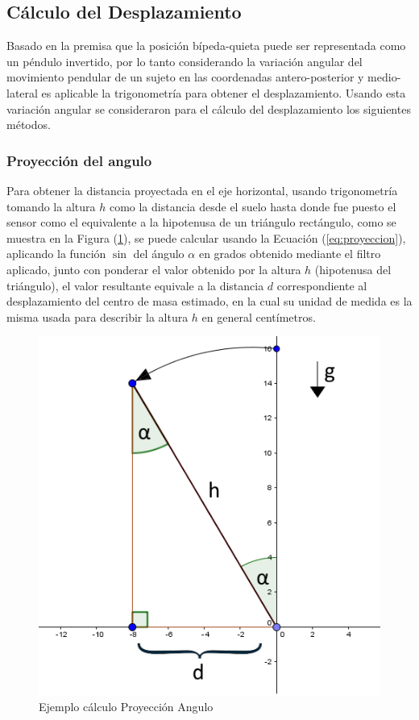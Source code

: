 \documentclass[12pt,a4paper]{article}
\begin{document}
\subsection{Cálculo del Desplazamiento}
Basado en la premisa que la posición bípeda-quieta puede ser representada como un péndulo invertido, por lo tanto considerando la variación angular del movimiento pendular de un sujeto en las coordenadas antero-posterior y medio-lateral es aplicable la trigonometría para obtener el desplazamiento.
Usando esta variación angular se consideraron para el cálculo del desplazamiento los siguientes métodos. 

\subsubsection{Proyección del angulo}
Para obtener la distancia proyectada en el eje horizontal, usando trigonometría tomando la altura $h$ como la distancia desde el suelo hasta donde fue puesto el sensor como el equivalente a la hipotenusa de un triángulo rectángulo, como se muestra en la Figura (\ref{fig:proyeccion}), se puede calcular usando la Ecuación (\ref{eq:proyeccion}), aplicando la función $\sin$ del ángulo $\alpha$ en grados obtenido mediante el filtro aplicado, junto con ponderar el valor obtenido por la altura $h$ (hipotenusa del triángulo), el valor resultante equivale a la distancia $d$ correspondiente al desplazamiento del centro de masa estimado, en la cual su unidad de medida es la misma usada para describir la altura $h$ en general centímetros.

\begin{figure}[H]
	\centering
	\includegraphics[scale=0.6]{images/calculoProyeccion}
	\caption{Ejemplo cálculo Proyección Angulo}
	\label{fig:proyeccion}
\end{figure}
\end{document}
